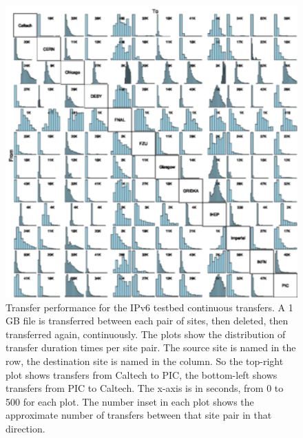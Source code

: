 \begin{figure}[htp]
\centering
\includegraphics{full-mesh}
\caption{Transfer performance for the IPv6 testbed continuous transfers. A 1 GB file is transferred between each pair of sites, then deleted, then transferred again, continuously. The plots show the distribution of transfer duration times per site pair. The source site is named in the row, the destination site is named in the column. So the top-right plot shows transfers from Caltech to PIC, the bottom-left shows transfers from PIC to Caltech. The x-axis is in seconds, from 0 to 500 for each plot. The number inset in each plot shows the approximate number of transfers between that site pair in that direction.}\label{fig:full-mesh}
\end{figure}


